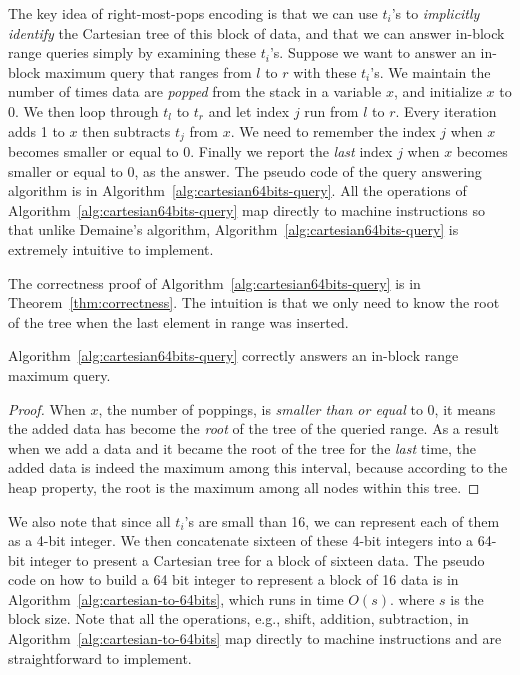 The key idea of right-most-pops encoding is that we can use $t_i$'s to
{\em implicitly identify} the Cartesian tree of this block of data,
and that we can answer in-block range queries simply by examining
these $t_i$'s.  Suppose we want to answer an in-block maximum query
that ranges from $l$ to $r$ with these $t_i$'s.  We maintain the
number of times data are {\em popped} from the stack in a variable
$x$, and initialize $x$ to 0.  We then loop through $t_l$ to $t_r$ and
let index $j$ run from $l$ to $r$.  Every iteration adds 1 to $x$ then
subtracts $t_j$ from $x$.  We need to remember the index $j$ when $x$
becomes smaller or equal to 0.  Finally we report the {\em last} index
$j$ when $x$ becomes smaller or equal to 0, as the answer.  The pseudo
code of the query answering algorithm is in
Algorithm~\ref{alg:cartesian64bits-query}.  All the operations of
Algorithm~\ref{alg:cartesian64bits-query} map directly to machine
instructions so that unlike Demaine's algorithm,
Algorithm~\ref{alg:cartesian64bits-query} is extremely intuitive to
implement.



The correctness proof of Algorithm~\ref{alg:cartesian64bits-query} is
in Theorem~\ref{thm:correctness}.  The intuition is that we only need
to know the root of the tree when the last element in range was
inserted.

\begin{theorem} \label{thm:correctness}
  Algorithm~\ref{alg:cartesian64bits-query} correctly answers an
  in-block range maximum query.
\end{theorem}
\begin{proof}
When $x$, the number of poppings, is {\em smaller than or equal} to 0,
it means the added data has become the {\em root} of the tree of the
queried range.  As a result when we add a data and it became the root
of the tree for the {\em last} time, the added data is indeed the
maximum among this interval, because according to the heap property,
the root is the maximum among all nodes within this tree.
\end{proof}

We also note that since all $t_i$'s are small than 16, we can
represent each of them as a 4-bit integer.  We then concatenate
sixteen of these 4-bit integers into a 64-bit integer to present a
Cartesian tree for a block of sixteen data.  The pseudo code on how to
build a 64 bit integer to represent a block of 16 data is in
Algorithm~\ref{alg:cartesian-to-64bits}, which runs in time
$O(s)$. where $s$ is the block size.  Note that all the operations,
e.g., shift, addition, subtraction, in
Algorithm~\ref{alg:cartesian-to-64bits} map directly to machine
instructions and are straightforward to implement.

